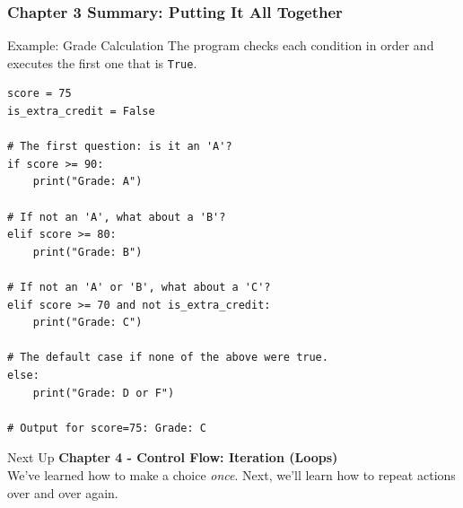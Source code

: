 \documentclass{beamer}
\begin{document}
\begin{frame}[fragile]
    \frametitle{Chapter 3 Summary: Putting It All Together}
    
    \begin{block}{Example: Grade Calculation}
        The program checks each condition in order and executes the first one that is \texttt{True}.
\begin{verbatim}
score = 75
is_extra_credit = False

# The first question: is it an 'A'?
if score >= 90:
    print("Grade: A")

# If not an 'A', what about a 'B'?
elif score >= 80:
    print("Grade: B")

# If not an 'A' or 'B', what about a 'C'?
elif score >= 70 and not is_extra_credit:
    print("Grade: C")

# The default case if none of the above were true.
else:
    print("Grade: D or F")

# Output for score=75: Grade: C
\end{verbatim}
    \end{block}

    \begin{alertblock}{Next Up}
        \textbf{Chapter 4 - Control Flow: Iteration (Loops)} \\
        We've learned how to make a choice \textit{once}. Next, we'll learn how to repeat actions over and over again.
    \end{alertblock}
\end{frame}
\end{document}

